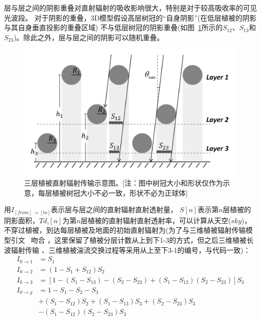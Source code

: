层与层之间的阴影重叠对直射辐射的吸收影响很大，特别是对于较高吸收率的可见光波段。
对于阴影的重叠，3D模型假设高层树冠的“自身阴影”(在低层植被的阴影与其自身垂直投影的重叠区域)
不与低层树冠的阴影重叠(如图~\ref{fig:三层植被结构示意图}所示的$S_{12}$、$S_{13}$和$S_{23}$)。除此之外，层与层之间的阴影可以随机重叠。%
{
\begin{figure}[htbp]
\centering
\includegraphics[width=0.8\columnwidth]{Figures/辐射过程及辐射通量计算/三层植被结构示意图.png}
\caption{三层植被直射辐射传输示意图。[注：图中树冠大小和形状仅作为示意，每层植被树冠大小不必一致，形状不必为正球体]}
\label{fig:三层植被结构示意图}
\end{figure}
}
用$I_{\left[from\right]\rightarrow\left[to\right]}$表示层与层之间的直射辐射直射透射量，
$S[n]$表示第$n$层植被的阴影面积，$Td$,$[n]$为第$n$层植被的直射辐射直射透射率，可以计算从天空($sky$)，
不穿过植被，到达每层植被及地面的初始直射辐射为(为了与三维植被辐射传输模型引文~\citep{yuan20143d} 吻合
，这里保留了植被分层计数从上到下1-3的方式，但之后三维植被长波辐射传输
、三维植被湍流交换过程等采用从上至下3-1的编号，与代码一致)：
\begin{equation}
\begin{aligned} I_{0 \rightarrow 1} &=S_{1} \\ I_{0 \rightarrow 2} &=\left(1-S_{1}+S_{12}\right) S_{2} \\ 
    I_{0 \rightarrow 3} &=\left[1-\left(S_{1}-S_{13}\right)-\left(S_{2}-S_{23}\right)+\left(S_{1}-S_{12}\right)\left(S_{2}-S_{23}\right)\right] S_{3} \\ 
    I_{0 \rightarrow g} &=1-S_{1}-S_{2}-S_{3} \\ &+\left(S_{1}-S_{12}\right) S_{2}+\left(S_{1}-S_{13}\right) S_{3}+\left(S_{2}-S_{23}\right) S_{3} \\
     &-\left(S_{1}-S_{12}\right)\left(S_{2}-S_{23}\right) S_{3} \end{aligned}
\end{equation}
